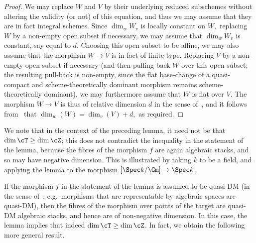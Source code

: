 \begin{proof}
We may replace $W$ and $V$ by their underlying reduced subschemes
without altering the validity (or not) of this equation,
and thus we may assume that they are in fact integral schemes. 
Since $\dim_w W_v$ is locally constant on $W,$ replacing $W$ 
by a non-empty open subset if necessary, we may assume that $\dim_w W_v$
is constant, say equal to $d$.  Choosing this open subset to be affine,
we may also assume that the morphism $W\to V$ is in fact of finite type.
Replacing $V$ by a non-empty open subset if necessary
(and then pulling back $W$ over this open subset; the resulting pull-back
is non-empty, since the flat base-change of a quasi-compact 
and scheme-theoretically
dominant morphism remains scheme-theoretically dominant),
we may furthermore assume that $W$ is flat over $V$.
The morphism $W\to V$ is thus of relative dimension $d$
in the sense
          of~\cite[\href{http://stacks.math.columbia.edu/tag/02NJ}{Tag
            02NJ}]{stacks-project},
   and it follows 
          from~\cite[\href{http://stacks.math.columbia.edu/tag/0AFE}{Tag
            0AFE}]{stacks-project} that
   $\dim_w(W) = \dim_v(V) + d,$ as required.
\end{proof}

\begin{aremark}
	We note that in the context of the preceding lemma,
	it need not be that $\dim \cT \geq \dim \cZ$; this does
	not contradict the inequality in the statement of the lemma, because
	the fibres of the morphism $f$ are again algebraic stacks, and
	so may have negative dimension.  This is illustrated by taking
	$k$ to be a field, and applying the lemma to the morphism
	$[\Spec k/\Gm] \to \Spec k$.

	If the morphism $f$ in the statement of the lemma is assumed
	to be quasi-DM (in the sense
        of~\cite[\href{http://stacks.math.columbia.edu/tag/04YW}{Tag
        04YW}]{stacks-project}; e.g.\ morphisms that are
        representable by algebraic spaces are quasi-DM),
	then the fibres of the morphism over points of the target
	are quasi-DM algebraic stacks, and hence are of non-negative
	dimension.  In this case, the lemma implies
	that indeed $\dim \cT \geq \dim \cZ$.  In fact, we obtain
	the following more general result.
\end{aremark}

